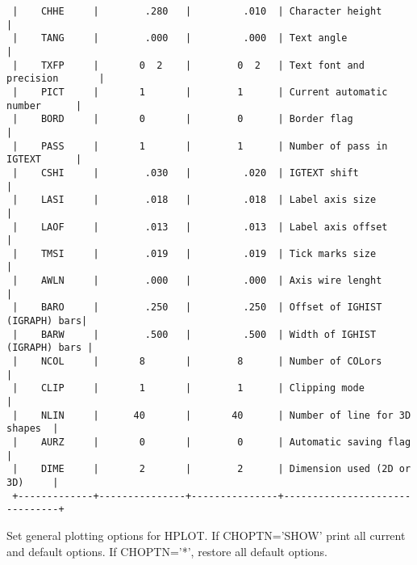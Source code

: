 \begin{verbatim}
 |    CHHE     |        .280   |         .010  | Character height              |
 |    TANG     |        .000   |         .000  | Text angle                    |
 |    TXFP     |       0  2    |        0  2   | Text font and precision       |
 |    PICT     |       1       |        1      | Current automatic number      |
 |    BORD     |       0       |        0      | Border flag                   |
 |    PASS     |       1       |        1      | Number of pass in IGTEXT      |
 |    CSHI     |        .030   |         .020  | IGTEXT shift                  |
 |    LASI     |        .018   |         .018  | Label axis size               |
 |    LAOF     |        .013   |         .013  | Label axis offset             |
 |    TMSI     |        .019   |         .019  | Tick marks size               |
 |    AWLN     |        .000   |         .000  | Axis wire lenght              |
 |    BARO     |        .250   |         .250  | Offset of IGHIST (IGRAPH) bars|
 |    BARW     |        .500   |         .500  | Width of IGHIST (IGRAPH) bars |
 |    NCOL     |       8       |        8      | Number of COLors              |
 |    CLIP     |       1       |        1      | Clipping mode                 |
 |    NLIN     |      40       |       40      | Number of line for 3D shapes  |
 |    AURZ     |       0       |        0      | Automatic saving flag         |
 |    DIME     |       2       |        2      | Dimension used (2D or 3D)     |
 +-------------+---------------+---------------+-------------------------------+
\end{verbatim}
\ENDCMD


\BEGARG
{}
\ENDARG

   \par
Set general plotting options for HPLOT.  If CHOPTN='SHOW' print all current 
   and default options.  If CHOPTN='*', restore all default options.  

